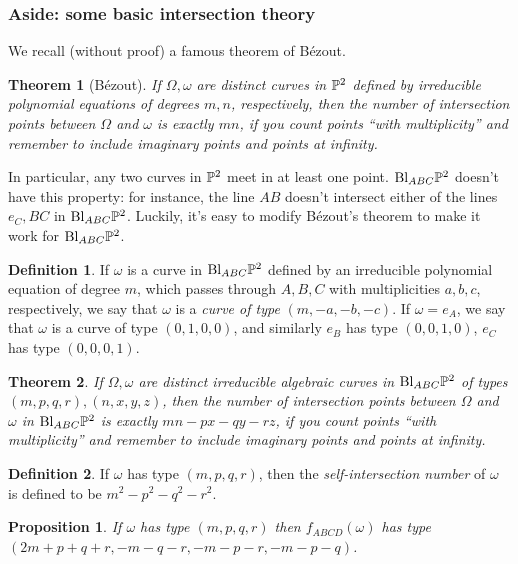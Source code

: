 \documentclass[letterpaper,11pt]{article}
\newtheorem{thm}{Theorem}
\newtheorem{prop}{Proposition}
\theoremstyle{definition}
\newtheorem{defn}{Definition}
\theoremstyle{remark}
\begin{document}
\subsubsection{Aside: some basic intersection theory}

We recall (without proof) a famous theorem of B\'ezout.

\begin{thm}[B\'ezout] If $\Omega,\omega$ are distinct curves in $\mathbb{P}^2$ defined by irreducible polynomial equations of degrees $m,n$, respectively, then the number of intersection points between $\Omega$ and $\omega$ is exactly $mn$, if you count points ``with multiplicity'' and remember to include imaginary points and points at infinity.
\end{thm}

In particular, any two curves in $\mathbb{P}^2$ meet in at least one point. $\text{\rm Bl}_{ABC}\mathbb{P}^2$ doesn't have this property: for instance, the line $AB$ doesn't intersect either of the lines $e_C, BC$ in $\text{\rm Bl}_{ABC}\mathbb{P}^2$. Luckily, it's easy to modify B\'ezout's theorem to make it work for $\text{\rm Bl}_{ABC}\mathbb{P}^2$.

\begin{defn} If $\omega$ is a curve in $\text{\rm Bl}_{ABC}\mathbb{P}^2$ defined by an irreducible polynomial equation of degree $m$, which passes through $A,B,C$ with multiplicities $a,b,c$, respectively, we say that $\omega$ is a \emph{curve of type} $(m,-a,-b,-c)$. If $\omega = e_A$, we say that $\omega$ is a curve of type $(0,1,0,0)$, and similarly $e_B$ has type $(0,0,1,0)$, $e_C$ has type $(0,0,0,1)$.
\end{defn}

\begin{thm}\label{intersection} If $\Omega,\omega$ are distinct irreducible algebraic curves in $\text{\rm Bl}_{ABC}\mathbb{P}^2$ of types $(m,p,q,r), (n,x,y,z)$, then the number of intersection points between $\Omega$ and $\omega$ in $\text{\rm Bl}_{ABC}\mathbb{P}^2$ is exactly $mn - px - qy - rz$, if you count points ``with multiplicity'' and remember to include imaginary points and points at infinity.
\end{thm}

\begin{defn} If $\omega$ has type $(m,p,q,r)$, then the \emph{self-intersection number} of $\omega$ is defined to be $m^2 - p^2 - q^2 - r^2$.
\end{defn}

\begin{prop}\label{cremona-type} If $\omega$ has type $(m,p,q,r)$ then $f_{ABCD}(\omega)$ has type $(2m+p+q+r,-m-q-r,-m-p-r,-m-p-q)$.
\end{prop}
\end{document}
